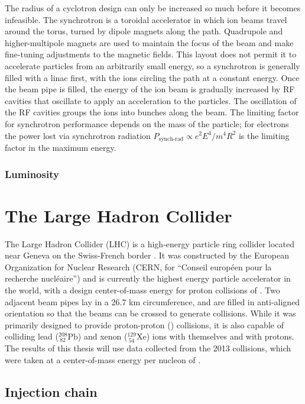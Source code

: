 The radius of a cyclotron design can only be increased so much before it becomes infeasible.
The synchrotron is a toroidal accelerator in which ion beams travel around the torus, turned by dipole magnets along the path.
Quadrupole and higher-multipole magnets are used to maintain the focus of the beam and make fine-tuning adjustments to the magnetic fields.
This layout does not permit it to accelerate particles from an arbitrarily small energy, so a synchrotron is generally filled with a linac first, with the ions circling the path at a constant energy.
Once the beam pipe is filled, the energy of the ion beam is gradually increased by RF cavities that oscillate to apply an acceleration to the particles.
The oscillation of the RF cavities groups the ions into bunches along the beam.
The limiting factor for synchrotron performance depends on the mass of the particle; for electrons the power lost via synchrotron radiation $P_\textrm{synch-rad} \propto e^2 E^4 / m^4 R^2 $ is the limiting factor in the maximum energy.

\subsubsection{Luminosity}

\section{The Large Hadron Collider}

The Large Hadron Collider (LHC) is a high-energy particle ring collider located near Geneva on the Swiss-French border \cite{LHCMachine}.
It was constructed by the European Organization for Nuclear Research (CERN, for ``Conseil européen pour la recherche nucléaire'') and is currently the highest energy particle accelerator in the world, with a design center-of-mass energy for proton collisions of \ppenergy.
Two adjacent beam pipes lay in a 26.7 km circumference, and are filled in anti-aligned orientation so that the beams can be crossed to generate collisions.
While it was primarily designed to provide proton-proton (\pp) collisions, it is also capable of colliding lead (${}^{208}_{\ 82}\textrm{Pb}$) and xenon (${}^{129}_{\ 54}\textrm{Xe}$) ions with themselves and with protons.
The results of this thesis will use data collected from the 2013 \pPb collisions, which were taken at a center-of-mass energy per nucleon of \pPbenergy.

\subsection{Injection chain}

